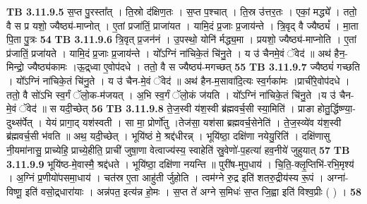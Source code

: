 \documentclass[17pt]{extarticle}
\begin{document}
{{{{{{{{{{{{{{{{{{{{{{                                \textbf{ TB 3.11.9.5} \newline
                  स॒प्त पु॒रस्ता᳚त् । ति॒स्रो द॑क्षिण॒तः । स॒प्त प॒श्चात् । ति॒स्र उ॑त्तर॒तः । एकां॒ मद्ध्ये᳚ । ततो॒ वै स प्र यशो॒ ज्यैष्ठ्य॑-माप्नोत् । ए॒तां प्रजा॑तिं॒ प्राजा॑यत । यामि॒दं प्र॒जाः प्र॒जाय॑न्ते । त्रि॒वृद् वै ज्यैष्ठ्यं᳚ । मा॒ता पि॒ता पु॒त्रः \textbf{ 54} \newline
                  \newline
                                \textbf{ TB 3.11.9.6} \newline
                  त्रि॒वृत् प्र॒जन॑नं । उ॒पस्थो॒ योनि॑ र्मद्ध्य॒मा । प्रयशो॒ ज्यैष्ठ्य॑-माप्नोति । ए॒तां प्र॑जातिं॒ प्रजा॑यते । यामि॒दं प्र॒जाः प्र॒जाय॑न्ते । यो᳚ऽग्निं ना॑चिके॒तं चि॑नु॒ते । य उ॑ चैनमे॒वं ॅवेद॑ ॥ अथ॑ हैन॒-मिन्द्रो॒ ज्यैष्ठ्य॑कामः ।ऊ॒द्र्ध्वा ए॒वोप॑दधे । ततो॒ वै स ज्यैष्ठ्य॑-मगच्छत् \textbf{ 55} \newline
                  \newline
                                \textbf{ TB 3.11.9.7} \newline
                  ज्यैष्ठ्यं॑ गच्छति । यो᳚ऽग्निं ना॑चिके॒तं चि॑नु॒ते । य उ॑ चैन-मे॒वं ॅवेद॑ ॥ अथ॑ हैन-म॒सावा॑दि॒त्यः स्व॒र्गका॑मः ।प्राची॑रे॒वोप॑दधे । ततो॒ वै सो॑ऽभि स्व॒र्गं ॅलो॒क-म॑जयत् । अ॒भि स्व॒र्गं ॅलो॒कं ज॑यति । यो᳚ऽग्निं ना॑चिके॒तं चि॑नु॒ते ।य उ॑ चैन-मे॒वं ॅवेद॑ ॥ स यदी॒च्छेत् \textbf{ 56} \newline
                  \newline
                                \textbf{ TB 3.11.9.8} \newline
                  ते॒ज॒स्वी य॑श॒स्वी ब्र॑ह्मवर्च॒सी स्या॒मिति॑ । प्राङा होतु॒र्द्धिष्ण्या॒-दुथ्स॑र्पेत् । येयं प्रागा॒द् यश॑स्वती । सा मा॒ प्रोर्णो॑तु ।तेज॑सा॒ यश॑सा ब्रह्मवर्च॒सेनेति॑ । ते॒ज॒स्व्ये॑व य॑श॒स्वी ब्र॑ह्मवर्च॒सी भ॑वति ॥ अथ॒ यदी॒च्छेत् । भूयि॑ष्ठं मे॒ श्रद्द॑धीरन्न् । भूयि॑ष्ठा॒ दक्षि॑णा नयेयु॒रिति॑ । दक्षि॑णासु नी॒यमा॑नासु॒ प्राच्येहि॒ प्राच्ये॒हीति॒ प्राची॑ जुषा॒णा वेत्वाज्य॑स्य॒ स्वाहेति॑ स्रु॒वेणो॑-प॒हत्या॑ हव॒नीये॑ जुहुयात् \textbf{ 57} \newline
                  \newline
                                \textbf{ TB 3.11.9.9} \newline
                  भूयि॑ष्ठ-मे॒वास्मै॒ श्रद्द॑धते । भूयि॑ष्ठा॒ दक्षि॑णा नयन्ति ॥ पुरी॑ष-मुप॒धाय॑ । चि॒ति॒-क्लृ॒प्तिभि॑-रभि॒मृश्य॑ । अ॒ग्निं प्र॒णीयो॑पसमा॒धाय॑ । चत॑स्र ए॒ता आहु॑ती र्जुहोति । त्वम॑ग्ने रु॒द्र इति॑ शतरु॒द्रीय॑स्य रू॒पं । अग्ना॑-विष्णू॒ इति॑ वसो॒द्र्धारा॑याः । अन्न॑पत॒ इत्य॑न्न हो॒मः । स॒प्त ते॑ अग्ने स॒मिधः॑ स॒प्त जि॒ह्वा इति॑ विश्व॒प्रीः ( ) । \textbf{ 58} \newline
}}}}}}}}}}}}}}}}}}}}}}
\end{document}
